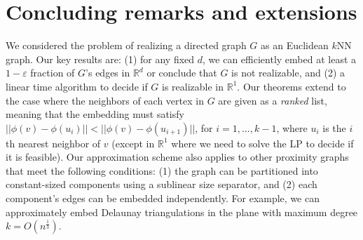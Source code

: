 \documentclass[11pt]{article}
\begin{document}
\section{Concluding remarks and extensions}

We considered the problem of realizing a directed graph $G$ as an Euclidean $k$NN graph. Our key results are: (1) for any fixed $d$, we can efficiently embed at least a $1 - \varepsilon$ fraction of $G$'s edges in $\mathbb{R}^d$ or conclude that $G$ is not realizable, and (2) a linear time algorithm to decide if $G$ is realizable in $\mathbb{R}^1$.
Our theorems extend to the case where the neighbors of each vertex in $G$ are given as a \emph{ranked} list, meaning that the embedding must satisfy $||\phi(v) - \phi(u_i)|| < || \phi(v) - \phi(u_{i+1})||$, for $i=1, \ldots, k-1$, where $u_i$ is the $i$th nearest neighbor of $v$ (except in $\mathbb{R}^1$ where we need to solve the LP to decide if it is feasible).
Our approximation scheme also applies to other proximity graphs that meet the following conditions: (1) the graph can be partitioned into constant-sized components using a sublinear size separator, and (2) each component's edges can be embedded independently. For example, we can approximately embed Delaunay triangulations in the plane with maximum degree $k = O(n^\frac{1}{3})$. 
\end{document}
